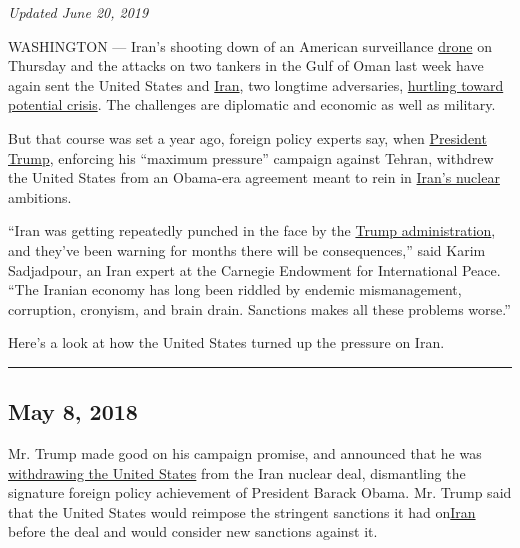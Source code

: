 \emph{Updated June 20, 2019}

WASHINGTON --- Iran's shooting down of an American surveillance
\href{https://www.nytimes.com/2019/06/20/us/politics/trump-iran.html}{drone}
on Thursday and the attacks on two tankers in the Gulf of Oman last week
have again sent the United States and
\href{https://www.nytimes.com/2019/06/17/us/politics/iran-nuclear-deal-uranium.html}{Iran},
two longtime adversaries,
\href{https://www.nytimes.com/2019/06/14/us/politics/trump-iran-tanker-hormuz.html}{hurtling
toward potential crisis}. The challenges are diplomatic and economic as
well as military.

But that course was set a year ago, foreign policy experts say, when
\href{https://www.nytimes.com/2019/06/20/us/politics/trump-iran.html}{President
Trump}, enforcing his ``maximum pressure'' campaign against Tehran,
withdrew the United States from an Obama-era agreement meant to rein in
\href{https://www.nytimes.com/2019/06/17/us/politics/iran-nuclear-deal-uranium.html}{Iran's
nuclear} ambitions.

``Iran was getting repeatedly punched in the face by the
\href{https://www.nytimes.com/2019/06/20/us/politics/trump-iran.html}{Trump
administration}, and they've been warning for months there will be
consequences,'' said Karim Sadjadpour, an Iran expert at the Carnegie
Endowment for International Peace. ``The Iranian economy has long been
riddled by endemic mismanagement, corruption, cronyism, and brain drain.
Sanctions makes all these problems worse.''

Here's a look at how the United States turned up the pressure on Iran.

\begin{center}\rule{0.5\linewidth}{\linethickness}\end{center}

\hypertarget{may-8-2018}{%
\subsection{May 8, 2018}\label{may-8-2018}}

Mr. Trump made good on his campaign promise, and announced that he was
\href{https://www.nytimes.com/2018/05/08/world/middleeast/trump-iran-nuclear-deal.html}{withdrawing
the United States} from the Iran nuclear deal, dismantling the signature
foreign policy achievement of President Barack Obama. Mr. Trump said
that the United States would reimpose the stringent sanctions it had
on\href{https://www.nytimes.com/2019/06/17/us/politics/iran-nuclear-deal-uranium.html}{Iran}
before the deal and would consider new sanctions against it.

